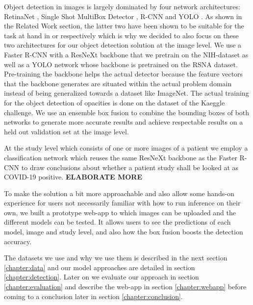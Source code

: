 Object detection in images is largely dominated by four network architectures: RetinaNet \autocite{lin_focal_2018}, Single Shot MultiBox Detector \autocite{liu_ssd_2016}, \acl{R-CNN} \autocite{girshick_rich_2014} and \ac{YOLO} \autocite{yoloOriginal}. As shown in the Related Work section, the latter two have been shown to be suitable for the task at hand in \autocite{podder_efficient_2021} or \autocite{al2021fast} respectively which is why we decided to also focus on these two architectures for our object detection solution at the image level. We use a Faster \acs{R-CNN} with a ResNeXt backbone that we pretrain on the NIH-dataset as well as a \acs{YOLO} network whose backbone is pretrained on the RSNA dataset. Pre-training the backbone helps the actual detector because the feature vectors that the backbone generates are situated within the actual problem domain instead of being generalized towards a dataset like ImageNet. The actual training for the object detection of opacities is done on the dataset of the Kaeggle challenge. We use an ensemble box fusion to combine the bounding boxes of both networks to generate more accurate results and achieve respectable results on a held out validation set at the image level.

At the study level which consists of one or more images of a patient we employ a classification network which reuses the same ResNeXt backbone as the Faster \ac{R-CNN} to draw conclusions about whether a patient study shall be looked at as COVID-19 positive. \textbf{ELABORATE MORE}

To make the solution a bit more approachable and also allow some hands-on experience for users not necessarily familiar with how to run inference on their own, we built a prototype web-app to which images can be uploaded and the different models can be tested. It allows users to see the predictions of each model, image and study level, and also how the box fusion boosts the detection accuracy. 

The datasets we use and why we use them is described in the next section \vref{chapter:data} and our model approaches are detailed in section \vref{chapter:detection}. Later on we evaluate our approach in section \vref{chapter:evaluation} and describe the web-app in section \vref{chapter:webapp} before coming to a conclusion later in section \vref{chapter:conclusion}.